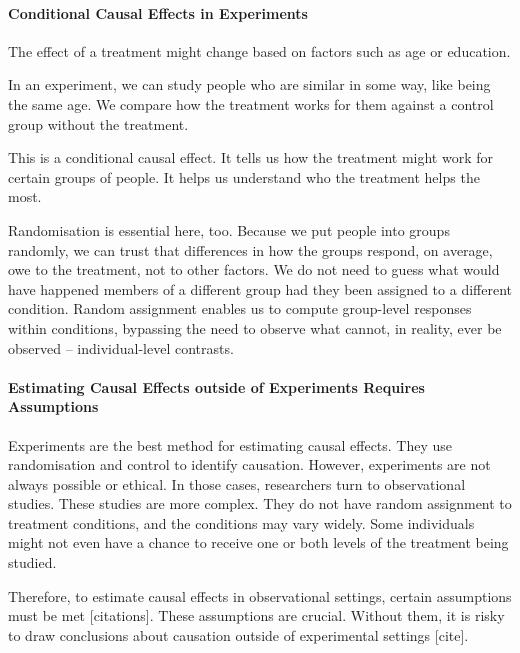 \documentclass[
  singlecolumn]{article}
\let\oldparagraph\paragraph
\renewcommand{\paragraph}[1]{\oldparagraph{#1}\mbox{}}
\begin{document}
\hypertarget{conditional-causal-effects-in-experiments}{%
\paragraph{\texorpdfstring{\textbf{Conditional Causal Effects in
Experiments}}{Conditional Causal Effects in Experiments}}\label{conditional-causal-effects-in-experiments}}

The effect of a treatment might change based on factors such as age or
education.

In an experiment, we can study people who are similar in some way, like
being the same age. We compare how the treatment works for them against
a control group without the treatment.

This is a conditional causal effect. It tells us how the treatment might
work for certain groups of people. It helps us understand who the
treatment helps the most.

Randomisation is essential here, too. Because we put people into groups
randomly, we can trust that differences in how the groups respond, on
average, owe to the treatment, not to other factors. We do not need to
guess what would have happened members of a different group had they
been assigned to a different condition. Random assignment enables us to
compute group-level responses within conditions, bypassing the need to
observe what cannot, in reality, ever be observed -- individual-level
contrasts.

\hypertarget{estimating-causal-effects-outside-of-experiments-requires-assumptions}{%
\paragraph{\texorpdfstring{\textbf{Estimating Causal Effects outside of
Experiments Requires
Assumptions}}{Estimating Causal Effects outside of Experiments Requires Assumptions}}\label{estimating-causal-effects-outside-of-experiments-requires-assumptions}}

Experiments are the best method for estimating causal effects. They use
randomisation and control to identify causation. However, experiments
are not always possible or ethical. In those cases, researchers turn to
observational studies. These studies are more complex. They do not have
random assignment to treatment conditions, and the conditions may vary
widely. Some individuals might not even have a chance to receive one or
both levels of the treatment being studied.

Therefore, to estimate causal effects in observational settings, certain
assumptions must be met {[}citations{]}. These assumptions are crucial.
Without them, it is risky to draw conclusions about causation outside of
experimental settings {[}cite{]}.
\end{document}
